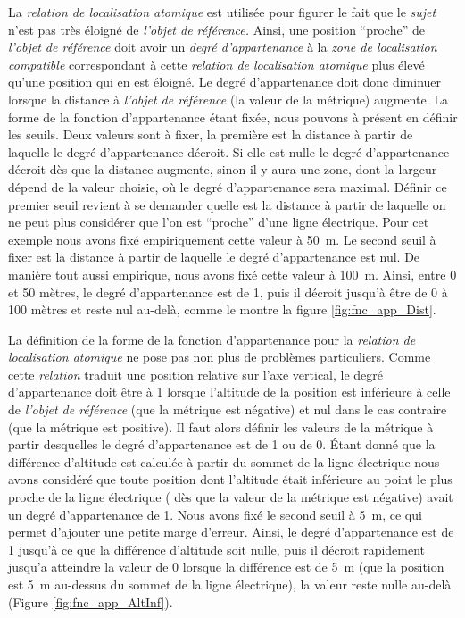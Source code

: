 La \emph{relation de localisation atomique}
est utilisée pour figurer le fait que le \emph{sujet} n'est pas très
éloigné de \emph{l'objet de référence.} Ainsi, une position
\enquote{proche} de \emph{l'objet de référence} doit avoir un
\emph{degré d'appartenance} à la \emph{zone de localisation
  compatible} correspondant à cette \emph{relation de localisation
  atomique} plus élevé qu'une position qui en est éloigné. Le degré
d'appartenance doit donc diminuer lorsque la distance à \emph{l'objet
  de référence} (\ie la valeur de la métrique) augmente. La forme de
la fonction d'appartenance étant fixée, nous pouvons à présent en
définir les seuils. Deux valeurs sont à fixer, la première est la
distance à partir de laquelle le degré d'appartenance décroit. Si elle
est nulle le degré d’appartenance décroit dès que la distance
augmente, sinon il y aura une zone, dont la largeur dépend de la
valeur choisie, où le degré d'appartenance sera maximal. Définir ce
premier seuil revient à se demander quelle est la distance à partir de
laquelle on ne peut plus considérer que l'on est \enquote{proche}
d'une ligne électrique. Pour cet exemple nous avons fixé empiriquement
cette valeur à \SI{50}{\meter}. Le second seuil à fixer est la
distance à partir de laquelle le degré d'appartenance est nul. De
manière tout aussi empirique, nous avons fixé cette valeur à
\SI{100}{\meter}. Ainsi, entre 0 et 50 mètres, le degré d'appartenance
est de 1, puis il décroit jusqu’à être de 0 à 100 mètres et reste nul
au-delà, comme le montre la figure \ref{fig:fnc_app_Dist}.

La définition de la forme de la fonction d'appartenance pour la
\emph{relation de localisation atomique}
 ne pose
pas non plus de problèmes particuliers. Comme cette \emph{relation}
traduit une position relative sur l'axe vertical, le degré
d'appartenance doit être à 1 lorsque l'altitude de la position est
inférieure à celle de \emph{l'objet de référence} (\ie que la métrique
est négative) et nul dans le cas contraire (\ie que la métrique est
positive). Il faut alors définir les valeurs de la métrique à partir
desquelles le degré d'appartenance est de 1 ou de 0. Étant donné que
la différence d'altitude est calculée à partir du sommet de la ligne
électrique nous avons considéré que toute position dont l'altitude
était inférieure au point le plus proche de la ligne électrique (\ie
dès que la valeur de la métrique est négative) avait un degré
d'appartenance de 1. Nous avons fixé le second seuil à \SI{5}{\meter},
ce qui permet d'ajouter une petite marge d'erreur. Ainsi, le degré
d'appartenance est de 1 jusqu’à ce que la différence d'altitude soit
nulle, puis il décroit rapidement jusqu'a atteindre la valeur de 0
lorsque la différence est de \SI{5}{\meter} (\ie que la position est
\SI{5}{\meter} au-dessus du sommet de la ligne électrique), la valeur
reste nulle au-delà (Figure \ref{fig:fnc_app_AltInf}).

